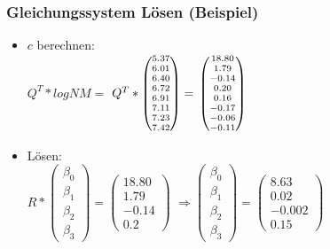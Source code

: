 \documentclass{beamer}
\begin{document}
\begin{frame}
  \frametitle{Gleichungssystem Lösen (Beispiel)}
  \begin{itemize}
  \item $c$ berechnen: \\ 
    $Q^T * log NM = $
    $Q^T * \scriptsize \begin{pmatrix} 5.37 \\ 6.01 \\ 6.40 \\ 6.72 \\ 6.91 \\ 7.11 \\ 7.23 \\ 7.42 \end{pmatrix} = $
    $\scriptsize \begin{pmatrix} 18.80 \\ 1.79 \\ -0.14 \\ 0.20 \\ 0.16 \\ -0.17 \\ -0.06 \\ -0.11 \end{pmatrix}$

    \pause

  \item Lösen: \\
    $R * \begin{pmatrix} \beta_0 \\ \beta_1 \\ \beta_2 \\ \beta_3 \end{pmatrix} = \begin{pmatrix} 18.80 \\ 1.79 \\ -0.14 \\ 0.2 \end{pmatrix}$
    \pause
    $\Rightarrow \begin{pmatrix} \beta_0 \\ \beta_1 \\ \beta_2 \\ \beta_3 \end{pmatrix} = \begin{pmatrix} 8.63 \\ 0.02 \\ -0.002 \\ 0.15 \end{pmatrix}$
  \end{itemize}
  \end{frame}
\end{document}
